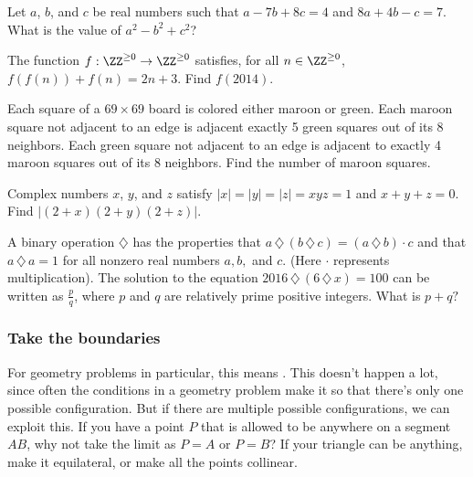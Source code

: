 \documentclass[11pt,paper=letter]{scrartcl}
\begin{document}
\begin{mdframed}[style=exmdbox]

\begin{problem}[AMC 10B 2002/20]
  Let $a$, $b$, and $c$ be real numbers such that $a-7b+8c=4$ and $8a+4b-c=7$. What is the value of $a^2-b^2+c^2$?
\end{problem}

\begin{problem}
  The function $f : \ZZ^{\geq 0} \to \ZZ^{\geq 0}$ satisfies, for all $n \in \ZZ^{\geq 0}$, $f(f(n)) + f(n) = 2n + 3$. Find $f(2014)$.
\end{problem}

\begin{problem}
  Each square of a $69 \times 69$ board is colored either maroon or green. Each maroon square not adjacent to an edge is adjacent exactly 5 green squares out of its 8 neighbors. Each green square not adjacent to an edge is adjacent to exactly 4 maroon squares out of its 8 neighbors. Find the number of maroon squares.
\end{problem}

\begin{problem}
  Complex numbers $x$, $y$, and $z$ satisfy $|x| = |y| = |z| = xyz = 1$ and $x + y + z = 0$. Find $|(2 + x)(2+y)(2+ z)|$. \hint{\ref{h:8}}
\end{problem}

\begin{problem}[AMC 10A 2016/23]
  A binary operation $\diamondsuit$ has the properties that $a\,\diamondsuit\, (b\,\diamondsuit \,c) = (a\,\diamondsuit \,b)\cdot c$ and that $a\,\diamondsuit \,a=1$ for all nonzero real numbers $a, b,$ and $c$. (Here $\cdot$ represents multiplication). The solution to the equation $2016 \,\diamondsuit\, (6\,\diamondsuit\, x)=100$ can be written as $\tfrac{p}{q}$, where $p$ and $q$ are relatively prime positive integers. What is $p+q?$
\end{problem}

\end{mdframed}

\subsubsection{Take the boundaries}

For geometry problems in particular, this means . This doesn't happen a lot, since often the conditions in a geometry problem make it so that there's only one possible configuration. But if there are multiple possible configurations, we can exploit this. If you have a point $P$ that is allowed to be anywhere on a segment $AB$, why not take the limit as $P = A$ or $P = B$? If your triangle can be anything, make it equilateral, or make all the points collinear.
\end{document}
